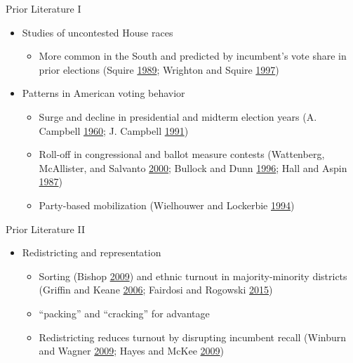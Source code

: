 \documentclass[
  ignorenonframetext,
]{beamer}
\providecommand{\tightlist}{%
  \setlength{\itemsep}{0pt}\setlength{\parskip}{0pt}}
\begin{document}
\begin{frame}{Prior Literature I}
\protect\hypertarget{prior-literature-i}{}
\begin{itemize}[<+->]
\tightlist
\item
  Studies of uncontested House races

  \begin{itemize}[<+->]
  \tightlist
  \item
    More common in the South and predicted by incumbent's vote share in
    prior elections (Squire \protect\hyperlink{ref-Squire1989}{1989};
    Wrighton and Squire \protect\hyperlink{ref-Wrighton1997}{1997})
  \end{itemize}
\end{itemize}

\begin{itemize}[<+->]
\tightlist
\item
  Patterns in American voting behavior

  \begin{itemize}[<+->]
  \tightlist
  \item
    Surge and decline in presidential and midterm election years
    (A. Campbell \protect\hyperlink{ref-Campbell1960}{1960}; J. Campbell
    \protect\hyperlink{ref-Campbell1991}{1991})
  \item
    Roll-off in congressional and ballot measure contests (Wattenberg,
    McAllister, and Salvanto
    \protect\hyperlink{ref-Wattenberg2000}{2000}; Bullock and Dunn
    \protect\hyperlink{ref-Bullock1996}{1996}; Hall and Aspin
    \protect\hyperlink{ref-Hall1987}{1987})
  \item
    Party-based mobilization (Wielhouwer and Lockerbie
    \protect\hyperlink{ref-Wielhouwer1994}{1994})
  \end{itemize}
\end{itemize}
\end{frame}

\begin{frame}{Prior Literature II}
\protect\hypertarget{prior-literature-ii}{}
\begin{itemize}[<+->]
\tightlist
\item
  Redistricting and representation

  \begin{itemize}[<+->]
  \tightlist
  \item
    Sorting (Bishop \protect\hyperlink{ref-Bishop2009}{2009}) and ethnic
    turnout in majority-minority districts (Griffin and Keane
    \protect\hyperlink{ref-Griffin2006}{2006}; Fairdosi and Rogowski
    \protect\hyperlink{ref-Fairdosi2015}{2015})
  \item
    ``packing'' and ``cracking'' for advantage
  \item
    Redistricting reduces turnout by disrupting incumbent recall
    (Winburn and Wagner \protect\hyperlink{ref-Winburn2009}{2009}; Hayes
    and McKee \protect\hyperlink{ref-Hayes2009}{2009})
  \end{itemize}
\end{itemize}
\end{frame}
\end{document}
